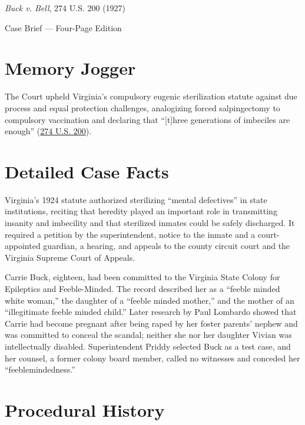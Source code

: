 \documentclass[12pt]{article}
\begin{document}
\begin{center}
{\LARGE \textit{Buck v. Bell}, 274 U.S. 200 (1927)\par}
\vspace{0.8em}
{\large Case Brief --- Four-Page Edition\par}
\end{center}
\vspace{1em}

\section{Memory Jogger}

The Court upheld Virginia's compulsory eugenic sterilization statute against due process and equal protection challenges, analogizing forced salpingectomy to compulsory vaccination and declaring that ``[t]hree generations of imbeciles are enough'' (\href{https://supreme.justia.com/cases/federal/us/274/200/}{274 U.S. 200}).

\section{Detailed Case Facts}

Virginia's 1924 statute authorized sterilizing ``mental defectives'' in state institutions, reciting that heredity played an important role in transmitting insanity and imbecility and that sterilized inmates could be safely discharged. It required a petition by the superintendent, notice to the inmate and a court-appointed guardian, a hearing, and appeals to the county circuit court and the Virginia Supreme Court of Appeals.

Carrie Buck, eighteen, had been committed to the Virginia State Colony for Epileptics and Feeble-Minded. The record described her as a ``feeble minded white woman,'' the daughter of a ``feeble minded mother,'' and the mother of an ``illegitimate feeble minded child.'' Later research by Paul Lombardo showed that Carrie had become pregnant after being raped by her foster parents' nephew and was committed to conceal the scandal; neither she nor her daughter Vivian was intellectually disabled. Superintendent Priddy selected Buck as a test case, and her counsel, a former colony board member, called no witnesses and conceded her ``feeblemindedness.''

\section{Procedural History}
\end{document}
